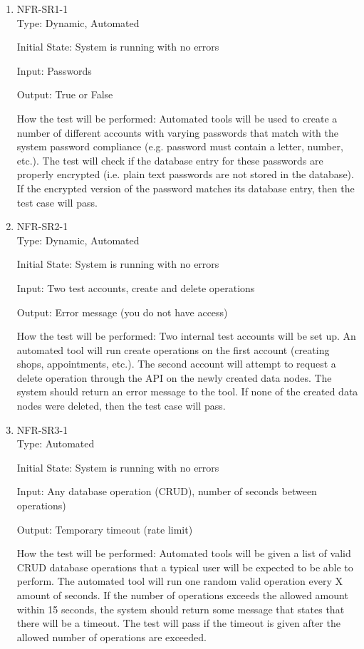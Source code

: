 \documentclass[12pt, titlepage]{article}
\begin{document}
\begin{enumerate}

\item{NFR-SR1-1}\\

Type: Dynamic, Automated

Initial State: System is running with no errors

Input: Passwords

Output: True or False

How the test will be performed: Automated tools will be used to create a number of different accounts with varying passwords that match with the system password compliance (e.g. password must contain a letter, number, etc.). The test will check if the database entry for these passwords are properly encrypted (i.e. plain text passwords are not stored in the database). If the encrypted version of the password matches its database entry, then the test case will pass.

\item{NFR-SR2-1}\\

Type: Dynamic, Automated

Initial State: System is running with no errors

Input: Two test accounts, create and delete operations

Output: Error message (you do not have access)

How the test will be performed: Two internal test accounts will be set up. An automated tool will run create operations on the first account (creating shops, appointments, etc.). The second account will attempt to request a delete operation through the API on the newly created data nodes. The system should return an error message to the tool. If none of the created data nodes were deleted, then the test case will pass.

\item{NFR-SR3-1}\\

Type: Automated

Initial State: System is running with no errors

Input: Any database operation (CRUD), number of seconds between operations)

Output: Temporary timeout (rate limit)

How the test will be performed: Automated tools will be given a list of valid CRUD database operations that a typical user will be expected to be able to perform. The automated tool will run one random valid operation every X amount of seconds. If the number of operations exceeds the allowed amount within 15 seconds, the system should return some message that states that there will be a timeout. The test will pass if the timeout is given after the allowed number of operations are exceeded.

\end{enumerate}
\end{document}
